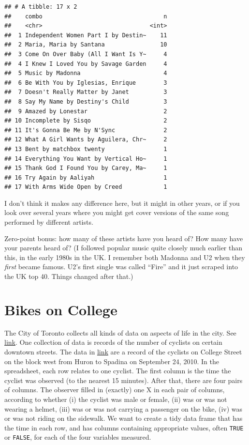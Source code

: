 \documentclass[]{tufte-book}
\theoremstyle{definition}
\theoremstyle{definition}
\theoremstyle{definition}
\theoremstyle{remark}
\begin{document}
\begin{verbatim}
## # A tibble: 17 x 2
##    combo                                   n
##    <chr>                               <int>
##  1 Independent Women Part I by Destin~    11
##  2 Maria, Maria by Santana                10
##  3 Come On Over Baby (All I Want Is Y~     4
##  4 I Knew I Loved You by Savage Garden     4
##  5 Music by Madonna                        4
##  6 Be With You by Iglesias, Enrique        3
##  7 Doesn't Really Matter by Janet          3
##  8 Say My Name by Destiny's Child          3
##  9 Amazed by Lonestar                      2
## 10 Incomplete by Sisqo                     2
## 11 It's Gonna Be Me by N'Sync              2
## 12 What A Girl Wants by Aguilera, Chr~     2
## 13 Bent by matchbox twenty                 1
## 14 Everything You Want by Vertical Ho~     1
## 15 Thank God I Found You by Carey, Ma~     1
## 16 Try Again by Aaliyah                    1
## 17 With Arms Wide Open by Creed            1
\end{verbatim}

I don't think it makes any difference here, but it might in other years,
or if you look over several years where you might get cover versions of
the same song performed by different artists.

Zero-point bonus: how many of these artists have you heard of? How many
have your parents heard of? (I followed popular music quite closely much
earlier than this, in the early 1980s in the UK. I remember both Madonna
and U2 when they \emph{first} became famous. U2's first single was
called ``Fire'' and it just scraped into the UK top 40. Things changed
after that.)

\hypertarget{bikes-on-college}{%
\section{Bikes on College}\label{bikes-on-college}}

The City of Toronto collects all kinds of data on aspects of life in the
city. See
\href{http://www1.toronto.ca/wps/portal/contentonly?vgnextoid=1a66e03bb8d1e310VgnVCM10000071d60f89RCRD}{link}.
One collection of data is records of the number of cyclists on certain
downtown streets. The data in
\href{http://www.utsc.utoronto.ca/~butler/c32/bikes.csv}{link} are a
record of the cyclists on College Street on the block west from Huron to
Spadina on September 24, 2010. In the spreadsheet, each row relates to
one cyclist. The first column is the time the cyclist was observed (to
the nearest 15 minutes). After that, there are four pairs of columns.
The observer filled in (exactly) one X in each pair of columns,
according to whether (i) the cyclist was male or female, (ii) was or was
not wearing a helmet, (iii) was or was not carrying a passenger on the
bike, (iv) was or was not riding on the sidewalk. We want to create a
tidy data frame that has the time in each row, and has columns
containing appropriate values, often \texttt{TRUE} or \texttt{FALSE},
for each of the four variables measured.
\end{document}
